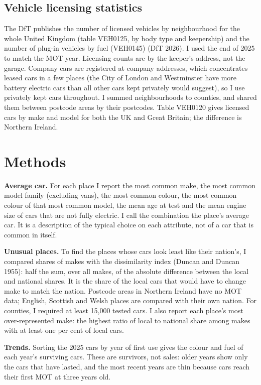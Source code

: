 \documentclass[11pt,a4paper]{article}
\begin{document}
\subsection{Vehicle licensing statistics}

The DfT publishes the number of licensed vehicles by neighbourhood for the whole United Kingdom (table VEH0125, by body type and keepership) and the number of plug-in vehicles by fuel (VEH0145) (DfT 2026). I used the end of 2025 to match the MOT year. Licensing counts are by the keeper's address, not the garage. Company cars are registered at company addresses, which concentrates leased cars in a few places (the City of London and Westminster have more battery electric cars than all other cars kept privately would suggest), so I use privately kept cars throughout. I summed neighbourhoods to counties, and shared them between postcode areas by their postcodes. Table VEH0120 gives licensed cars by make and model for both the UK and Great Britain; the difference is Northern Ireland.

\section{Methods}

\textbf{Average car.} For each place I report the most common make, the most common model family (excluding vans), the most common colour, the most common colour of that most common model, the mean age at test and the mean engine size of cars that are not fully electric. I call the combination the place's average car. It is a description of the typical choice on each attribute, not of a car that is common in itself.

\textbf{Unusual places.} To find the places whose cars look least like their nation's, I compared shares of makes with the dissimilarity index (Duncan and Duncan 1955): half the sum, over all makes, of the absolute difference between the local and national shares. It is the share of the local cars that would have to change make to match the nation. Postcode areas in Northern Ireland have no MOT data; English, Scottish and Welsh places are compared with their own nation. For counties, I required at least 15,000 tested cars. I also report each place's most over-represented make: the highest ratio of local to national share among makes with at least one per cent of local cars.

\textbf{Trends.} Sorting the 2025 cars by year of first use gives the colour and fuel of each year's surviving cars. These are survivors, not sales: older years show only the cars that have lasted, and the most recent years are thin because cars reach their first MOT at three years old.
\end{document}
